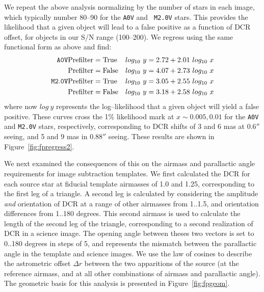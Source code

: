 \documentclass[DM,toc]{lsstdoc}
\begin{document}
We repeat the above analysis normalizing by the number of stars in
each image, which typically number 80--90 for the {\tt A0V} and {\tt
  M2.0V} stars.  This provides the likelihood that a given object will
lead to a false positive as a function of DCR offset, for objects in
our S/N range (100--200).  We regress using the same functional form
as above and find:
\begin{eqnarray}
{\tt A0V}   & {\rm Prefilter=True}  & log_{10}~y = 2.72 + 2.01 ~log_{10}~x \\ \nonumber
            & {\rm Prefilter=False} & log_{10}~y = 4.07 + 2.73 ~log_{10}~x \\ \nonumber
{\tt M2.0V} & {\rm Prefilter=True}  & log_{10}~y = 3.05 + 2.55 ~log_{10}~x \\ \nonumber
            & {\rm Prefilter=False} & log_{10}~y = 3.18 + 2.58 ~log_{10}~x
\end{eqnarray}
where now $log~y$ represents the log--likelihood that a given object
will yield a false positive.  These curves cross the 1\% likelihood
mark at $x \sim 0.005, 0.01$ for the {\tt A0V} and {\tt M2.0V} stars,
respectively, corresponding to DCR shifts of 3 and 6 mas at $0.6''$
seeing, and 5 and 9 mas in $0.88''$ seeing.  These results are shown in
Figure~\ref{fig:fpregress2}.

We next examined the consequences of this on the airmass and
parallactic angle requirements for image subtraction templates.  We
first calculated the DCR for each source star at fiducial template
airmasses of 1.0 and 1.25, corresponding to the first leg of a
triangle.  A second leg is calculated by considering the amplitude
{\it and} orientation of DCR at a range of other airmasses from
1..1.5, and orientation differences from 1..180 degrees.  This second
airmass is used to calculate the length of the second leg of the
triangle, corresponding to a second realization of DCR in a science
image.  The opening angle between theses two vectors is set to 0..180
degrees in steps of 5, and represents the mismatch between the
parallactic angle in the template and science images.  We use the law
of cosines to describe the astrometric offset $\Delta r$ between the two
apparitions of the source (at the reference airmass, and at all other
combinations of airmass and parallactic angle).  The geometric basis
for this analysis is presented in Figure~\ref{fig:fpgeom}.
\end{document}
